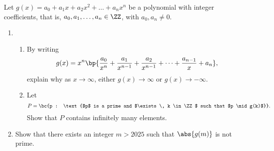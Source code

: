 \begin{problem}
    Let $g(x) = a_0 + a_1 x + a_2 x^2 + \dots + a_n x^n$ be a polynomial with integer coefficients, that is, $a_0, a_1, \dots, a_n \in \ZZ$, with $a_0, a_n \neq 0$.

    \begin{enumerate}
        \item \begin{enumerate}
            \item By writing \[g(x) = x^n \bp{\frac{a_0}{x^n} + \frac{a_1}{x^{n-1}} + \frac{a_2}{x^{n-1}} + \dots + \frac{a_{n-1}}{x} + a_n},\] explain why as $x \to \infty$, either $g(x) \to \infty$ or $g(x) \to -\infty$.
            \item Let \[P = \bc{p : \text{$p$ is a prime and $\exists \, k \in \ZZ$ such that $p \mid g(k)$}}.\] Show that $P$ contains infinitely many elements.
        \end{enumerate}
        \item Show that there exists an integer $m > 2025$ such that $\abs{g(m)}$ is not prime.
    \end{enumerate}
\end{problem}
